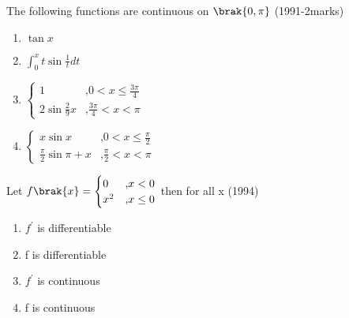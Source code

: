 		\item The following functions are continuous on $\brak{0,\pi}$ \hfill{(1991-2marks)}
			\begin{enumerate}
				\item $\tan{x}$
				\item $\int_{0}^{x}t\sin{\frac{1}{t}}dt$ 
				\item $\begin{cases} 1 & \text{,} 0<x\leq\frac{3\pi}{4} \\
				2\sin{\frac{2}{9}x} & \text{,} \frac{3\pi}{4}<x<\pi \end{cases}$
			\item $\begin{cases} x\sin{x} & \text{,} 0<x\leq\frac{\pi}{2} \\ \frac{\pi}{2}\sin{\pi+x} & \text{,} \frac{\pi}{2}<x<\pi \end{cases}$
			\end{enumerate}
		\item Let $f\brak{x}=\begin{cases} 0 & \text{,} x<0 \\
                             x^2 & \text{,} x\leq0 \end{cases}$ then for all x \hfill{(1994)}
			     \begin{enumerate}
				     \item $f^{\prime}$ is differentiable
				     \item f is differentiable
				     \item $f^{\prime}$ is continuous
				     \item f is continuous
			     \end{enumerate}

